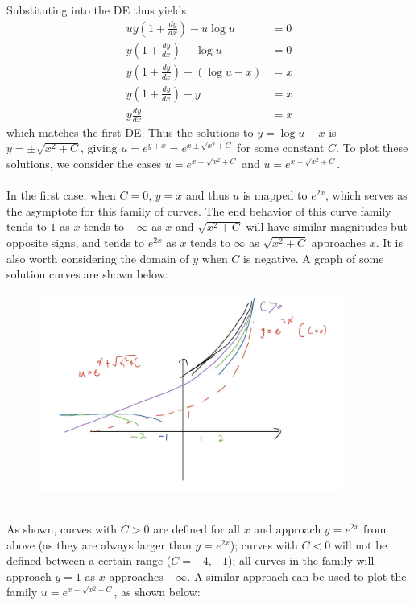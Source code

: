 \documentclass{article}
\begin{document}
Substituting into the DE thus yields
\begin{equation*}
    \begin{aligned}
        uy(1+\frac{dy}{dx}) - u \log u &= 0 \\
        y(1+\frac{dy}{dx}) - \log u &= 0 \\
        y(1+\frac{dy}{dx}) - (\log u - x) &= x \\
        y(1+\frac{dy}{dx}) - y &= x \\
        y\frac{dy}{dx} &= x
    \end{aligned}
\end{equation*}
which matches the first DE. Thus the solutions to $y = \log u - x$ is $y = \pm \sqrt{x^2+C}$, giving $u = e^{y+x} = e^{x \pm \sqrt{x^2+C}}$ for some constant $C$. To plot these solutions, we consider the cases $u = e^{x+\sqrt{x^2+C}}$ and $u=e^{x-\sqrt{x^2+C}}$.\\ \\ 
In the first case, when $C = 0$, $y = x$ and thus $u$ is mapped to $e^{2x}$, which serves as the asymptote for this family of curves. The end behavior of this curve family tends to $1$ as $x$ tends to $-\infty$ as $x$ and $\sqrt{x^2+C}$ will have similar magnitudes but opposite signs, and tends to $e^{2x}$ as $x$ tends to $\infty$ as $\sqrt{x^2+C}$ approaches $x$. It is also worth considering the domain of $y$ when $C$ is negative. A graph of some solution curves are shown below:
\begin{figure}[h]
    \centering
    \includegraphics[width=10cm]{DE-ch2-7-3.jpg}
\end{figure}\\
As shown, curves with $C>0$ are defined for all $x$ and approach $y=e^{2x}$ from above (as they are always larger than $y=e^{2x}$); curves with $C<0$ will not be defined between a certain range ($C=-4, -1$); all curves in the family will approach $y=1$ as $x$ approaches $-\infty$. A similar approach can be used to plot the family $u=e^{x-\sqrt{x^2+C}}$, as shown below:
\end{document}
